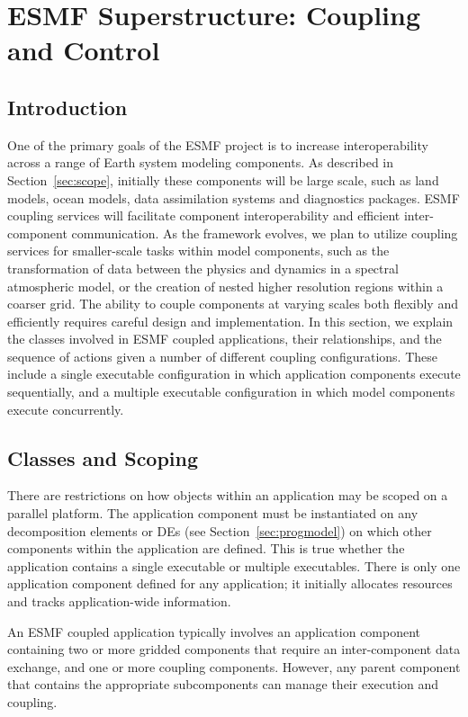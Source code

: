 \section{ESMF Superstructure:  Coupling and Control}
\label{sec:superclasses}

\subsection{Introduction}

One of the primary goals of the ESMF project is to increase interoperability
across a range of Earth system modeling components.  As described in 
Section~\ref{sec:scope}, initially these 
components will be large scale, such as land models, ocean models, 
data assimilation systems and diagnostics packages.  ESMF coupling 
services will facilitate component 
interoperability and efficient inter-component communication.  As the 
framework evolves, we plan to utilize coupling services for smaller-scale 
tasks within model components, such as the transformation of data between the 
physics and dynamics in a spectral atmospheric model, or the creation 
of nested higher resolution regions within a coarser grid.  The ability to 
couple components at varying scales both flexibly and efficiently requires
careful design and implementation.  In this section, we 
explain the classes involved in ESMF coupled applications, their 
relationships, and the sequence of actions given a number of different 
coupling configurations.  These include a single executable configuration in 
which application components execute sequentially, and a multiple executable
configuration in which model components execute concurrently.

\subsection{Classes and Scoping}

There are restrictions on how objects within an application may be scoped
on a parallel platform.  The application component must be instantiated on 
any decomposition elements or DEs (see Section~\ref{sec:progmodel}) on 
which other components
within the application are defined.  This is true whether the 
application contains a single executable or multiple 
executables.  There is only one application component defined for any
application; it initially allocates resources and tracks application-wide 
information.  

An ESMF coupled application typically involves an application component 
containing two or more gridded components that require an 
inter-component data exchange, and one or more coupling 
components.  However, any parent component that contains the appropriate 
subcomponents can manage their execution and coupling.

